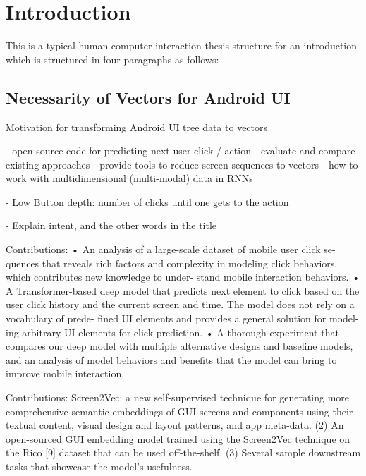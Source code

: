\chapter{Introduction}
\label{sec:introduction}

This is a typical human-computer interaction thesis structure for an introduction which is structured in four paragraphs as follows:

\section{Necessarity of Vectors for Android UI}

Motivation for transforming Android UI tree data to vectors

- open source code for predicting next user click / action
- evaluate and compare existing approaches
- provide tools to reduce screen sequences to vectors
- how to work with multidimensional (multi-modal) data in RNNs

- Low Button depth: number of clicks until one gets to the action \cite{lee2018click}

- Explain intent, and the other words in the title

Contributions: \cite{zhou2021large}
• An analysis of a large-scale dataset of mobile user click se-
quences that reveals rich factors and complexity in modeling
click behaviors, which contributes new knowledge to under-
stand mobile interaction behaviors.
• A Transformer-based deep model that predicts next element
to click based on the user click history and the current screen
and time. The model does not rely on a vocabulary of prede-
fined UI elements and provides a general solution for model-
ing arbitrary UI elements for click prediction.
• A thorough experiment that compares our deep model with
multiple alternative designs and baseline models, and an
analysis of model behaviors and benefits that the model can
bring to improve mobile interaction.

Contributions: \cite{li2021screen2vec}
Screen2Vec: a new self-supervised technique for generating
more comprehensive semantic embeddings of GUI screens
and components using their textual content, visual design
and layout patterns, and app meta-data.
(2) An open-sourced GUI embedding model trained using the
Screen2Vec technique on the Rico [9] dataset that can be
used off-the-shelf.
(3) Several sample downstream tasks that showcase the model’s
usefulness.

